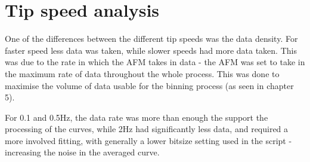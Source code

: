 \section{Tip speed analysis}

One of the differences between the different tip speeds was the data density. For faster speed less data was taken, while slower speeds had more data taken. This was due to the rate in which the AFM takes in data - the AFM was set to take in the maximum rate of data throughout the whole process. This was done to maximise the volume of data usable for the binning process (as seen in chapter 5). 

For 0.1 and 0.5Hz, the data rate was more than enough the support the processing of the curves, while 2Hz had significantly less data, and required a more involved fitting, with generally a lower bitsize setting used in the script - increasing the noise in the averaged curve.



